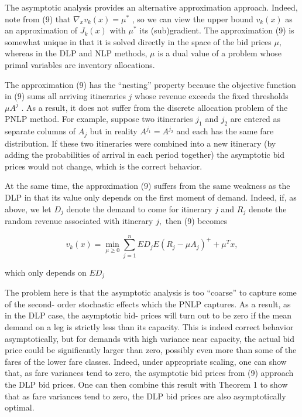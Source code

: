 The asymptotic analysis provides an alternative approximation approach.
Indeed, note from (9) that \(\nabla_{x}v_{k}(x) = \mu^{*}\) , so we can
view the upper bound \(v_{k}(x)\) as an approximation of \(J_{k}(x)\)
with \(\mu^{*}\) its (sub)gradient. The approximation (9) is somewhat
unique in that it is solved directly in the space of the bid prices
\(\mu ,\) whereas in the DLP and NLP methods, \(\mu\) is a dual value of
a problem whose primal variables are inventory allocations.

The approximation (9) has the ``nesting'' property because the objective
function in (9) sums all arriving itineraries \(j\) whose revenue
exceeds the fixed thresholds \(\mu A^{j}\) . As a result, it does not
suffer from the discrete allocation problem of the PNLP method. For
example, suppose two itineraries \(j_{1}\) and \(j_{2}\) are entered as
separate columns of \(A_{j}\) but in reality \(A^{j_{1}} = A^{j_{2}}\)
and each has the same fare distribution. If these two itineraries were
combined into a new itinerary (by adding the probabilities of arrival in
each period together) the asymptotic bid prices would not change, which
is the correct behavior.

At the same time, the approximation (9) suffers from the same weakness
as the DLP in that its value only depends on the first moment of demand.
Indeed, if, as above, we let \(D_{j}\) denote the demand to come for
itinerary \(j\) and \(R_{j}\) denote the random revenue associated with
itinerary \(j,\) then (9) becomes

\[
v_{k}(x) = \min_{\mu \geq 0}\sum_{j = 1}^{n}ED_{j}E(R_{j} - \mu A_{j})^{+} + \mu^{T}x,
\]

which only depends on \(ED_{j}\)

The problem here is that the asymptotic analysis is too ``coarse'' to
capture some of the second- order stochastic effects which the PNLP
captures. As a result, as in the DLP case, the asymptotic bid- prices
will turn out to be zero if the mean demand on a leg is strictly less
than its capacity. This is indeed correct behavior asymptotically, but
for demands with high variance near capacity, the actual bid price could
be significantly larger than zero, possibly even more than some of the
fares of the lower fare classes. Indeed, under appropriate scaling, one
can show that, as fare variances tend to zero, the asymptotic bid prices
from (9) approach the DLP bid prices. One can then combine this result
with Theorem 1 to show that as fare variances tend to zero, the DLP bid
prices are also asymptotically optimal.

